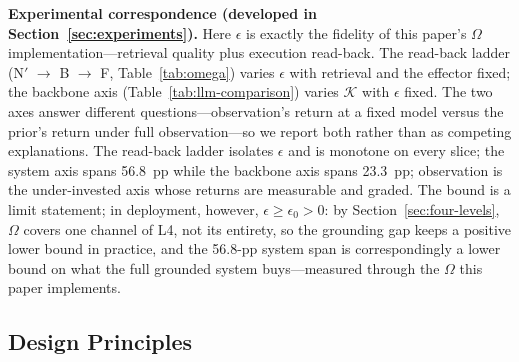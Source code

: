 \textbf{Experimental correspondence (developed in Section~\ref{sec:experiments}).} Here $\epsilon$ is exactly the fidelity of this paper's $\Omega$ implementation---retrieval quality plus execution read-back. The read-back ladder (N$'$ $\to$ B $\to$ F, Table~\ref{tab:omega}) varies $\epsilon$ with retrieval and the effector fixed; the backbone axis (Table~\ref{tab:llm-comparison}) varies $\mathcal{K}$ with $\epsilon$ fixed. The two axes answer different questions---observation's return at a fixed model versus the prior's return under full observation---so we report both rather than as competing explanations. The read-back ladder isolates $\epsilon$ and is monotone on every slice; the system axis spans 56.8~pp while the backbone axis spans 23.3~pp; observation is the under-invested axis whose returns are measurable and graded. The bound is a limit statement; in deployment, however, $\epsilon \ge \epsilon_0 > 0$: by Section~\ref{sec:four-levels}, $\Omega$ covers one channel of L4, not its entirety, so the grounding gap keeps a positive lower bound in practice, and the 56.8-pp system span is correspondingly a lower bound on what the full grounded system buys---measured through the $\Omega$ this paper implements.

\subsection{Design Principles}
\label{sec:prediction}


